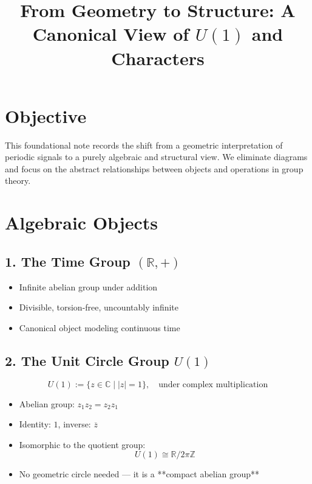 \documentclass[12pt]{article}
\title{\textbf{From Geometry to Structure: A Canonical View of \( U(1) \) and Characters}}
\author{}
\date{}
\begin{document}
	\maketitle
	
	\section{Objective}
	
	This foundational note records the shift from a geometric interpretation of periodic signals to a purely algebraic and structural view. We eliminate diagrams and focus on the abstract relationships between objects and operations in group theory.
	
	\section{Algebraic Objects}
	
	\subsection*{1. The Time Group \((\mathbb{R}, +)\)}
	
	\begin{itemize}[leftmargin=1.5em]
		\item Infinite abelian group under addition
		\item Divisible, torsion-free, uncountably infinite
		\item Canonical object modeling continuous time
	\end{itemize}
	
	\subsection*{2. The Unit Circle Group \( U(1) \)}
	
	\[
	U(1) := \{ z \in \mathbb{C} \mid |z| = 1 \}, \quad \text{under complex multiplication}
	\]
	
	\begin{itemize}[leftmargin=1.5em]
		\item Abelian group: \( z_1 z_2 = z_2 z_1 \)
		\item Identity: \( 1 \), inverse: \( \overline{z} \)
		\item Isomorphic to the quotient group:
		\[
		U(1) \cong \mathbb{R} / 2\pi\mathbb{Z}
		\]
		\item No geometric circle needed — it is a **compact abelian group**
	\end{itemize}
	
\end{document}

